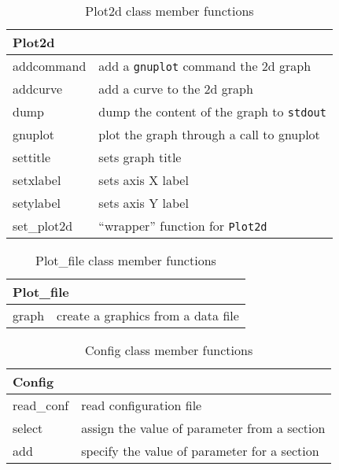\documentclass[11pt,fleqn,letterpaper]{report}
\begin{document}
\begin{table}[htbp]
\caption{Plot2d class member functions}
\label{tab:commandsum1j}
\begin{center}
\begin{tabular}{||l|l||}
\hline
\hline
\multicolumn{2}{||l||}{{\bf Plot2d}} \\
\hline
\hline
addcommand & add a {\tt gnuplot} command the 2d graph \\
\hline
addcurve & add a curve to the 2d graph \\
\hline
dump & dump the content of the graph to {\tt stdout} \\
\hline
gnuplot & plot the graph through a call to \textsf{gnuplot} \\
\hline
settitle & sets graph title  \\
\hline
setxlabel & sets axis X label \\
\hline
setylabel & sets axis Y label \\
\hline
set\_plot2d & ``wrapper'' function for \texttt{Plot2d} \\
\hline
\hline
\end{tabular}
\end{center}
\end{table}

\begin{table}[htbp]
\caption{Plot\_file class member functions}
\label{tab:commandsum1k}
\begin{center}
\begin{tabular}{||l|l||}
\hline
\hline
\multicolumn{2}{||l||}{{\bf Plot\_file}} \\
\hline
\hline
graph & create a graphics from a data file \\
\hline
\hline
\end{tabular}
\end{center}
\end{table}

\begin{table}[htbp]
\caption{Config class member functions}
\label{tab:commandsum1l}
\begin{center}
\begin{tabular}{||l|l||}
\hline
\hline
\multicolumn{2}{||l||}{{\bf Config}} \\
\hline
\hline
read\_conf & read configuration file \\
\hline
select & assign the value of parameter from a section  \\
\hline
add & specify the value of parameter for a section  \\
\hline
\hline
\end{tabular}
\end{center}
\end{table}
\end{document}
